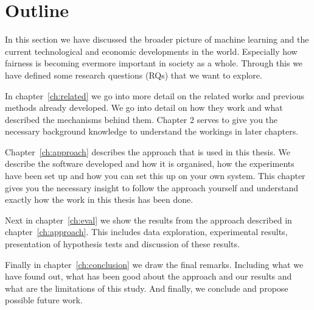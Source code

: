 \section{Outline}
\label{sec:intro:outline}

In this section we have discussed the broader picture of machine learning and the current technological and economic developments in the world. Especially how fairness is becoming evermore important in society as a whole. Through this we have defined some research questions (RQs) that we want to explore.

In chapter~\ref{ch:related} we go into more detail on the related works and previous methods already developed. We go into detail on how they work and what described the mechanisms behind them. Chapter 2 serves to give you the necessary background knowledge to understand the workings in later chapters.

Chapter~\ref{ch:approach} describes the approach that is used in this thesis. We describe the software developed and how it is organised, how the experiments have been set up and how you can set this up on your own system. This chapter gives you the necessary insight to follow the approach yourself and understand exactly how the work in this thesis has been done.

Next in chapter~\ref{ch:eval} we show the results from the approach described in chapter~\ref{ch:approach}. This includes data exploration, experimental results, presentation of hypothesis tests and discussion of these results. 

Finally in chapter~\ref{ch:conclusion} we draw the final remarks. Including what we have found out, what has been good about the approach and our results and what are the limitations of this study. And finally, we conclude and propose possible future work.